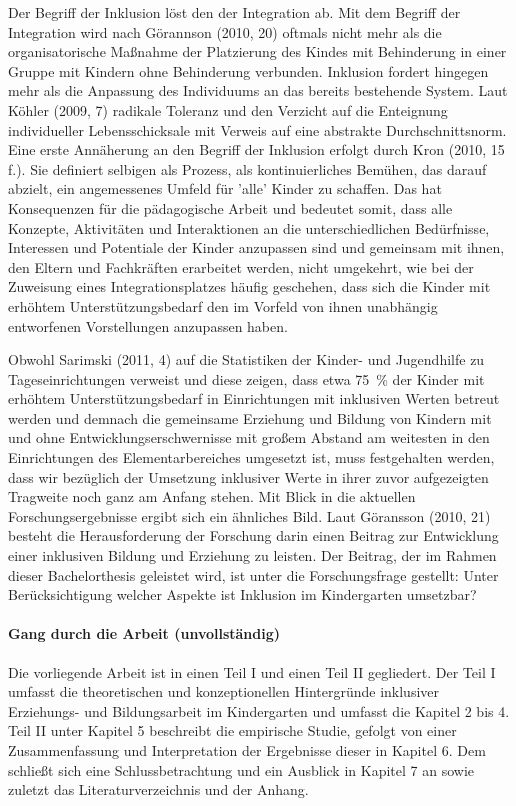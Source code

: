 Der Begriff der Inklusion löst den der Integration ab. Mit dem Begriff der Integration wird nach Görannson (2010, 20) oftmals nicht mehr als die organisatorische Maßnahme der Platzierung des Kindes mit Behinderung in einer Gruppe mit Kindern ohne Behinderung verbunden. Inklusion fordert hingegen mehr als die Anpassung des Individuums an das bereits bestehende System. Laut Köhler (2009, 7) radikale Toleranz und den Verzicht auf die Enteignung individueller Lebensschicksale mit Verweis auf eine abstrakte Durchschnittsnorm. Eine erste Annäherung an den Begriff der Inklusion erfolgt durch Kron (2010, 15 f.). Sie definiert selbigen als Prozess, als kontinuierliches Bemühen, das darauf abzielt, ein angemessenes Umfeld für ’alle’ Kinder zu schaffen. Das hat Konsequenzen für die pädagogische Arbeit und bedeutet somit, dass alle Konzepte, Aktivitäten und Interaktionen an die unterschiedlichen Bedürfnisse, Interessen und Potentiale der Kinder anzupassen sind und gemeinsam mit ihnen, den Eltern und Fachkräften erarbeitet werden, nicht umgekehrt, wie bei der Zuweisung eines Integrationsplatzes häufig geschehen, dass sich die Kinder mit erhöhtem Unterstützungsbedarf den im Vorfeld von ihnen unabhängig entworfenen Vorstellungen anzupassen haben.  

Obwohl Sarimski (2011, 4) auf die Statistiken der Kinder- und Jugendhilfe zu Tageseinrichtungen verweist und diese zeigen, dass etwa 75~\% der Kinder mit erhöhtem Unterstützungsbedarf in Einrichtungen mit inklusiven Werten betreut werden und demnach die gemeinsame Erziehung und Bildung von Kindern mit und ohne Entwicklungserschwernisse mit großem Abstand am weitesten in den Einrichtungen des Elementarbereiches umgesetzt ist, muss festgehalten werden, dass wir bezüglich der Umsetzung inklusiver Werte in ihrer zuvor aufgezeigten Tragweite noch ganz am Anfang stehen. Mit Blick in die aktuellen Forschungsergebnisse ergibt sich ein ähnliches Bild. Laut Göransson (2010, 21) besteht die Herausforderung der Forschung darin einen Beitrag zur Entwicklung einer inklusiven Bildung und Erziehung zu leisten. Der Beitrag, der im Rahmen dieser Bachelorthesis geleistet wird, ist unter die Forschungsfrage gestellt: Unter Berücksichtigung welcher Aspekte ist Inklusion im Kindergarten umsetzbar?

\paragraph{Gang durch die Arbeit (unvollständig)} 
Die vorliegende Arbeit ist in einen Teil I und einen Teil II gegliedert. Der Teil I umfasst die theoretischen und konzeptionellen Hintergründe inklusiver Erziehungs- und Bildungsarbeit im Kindergarten und umfasst die Kapitel 2 bis 4. Teil II unter Kapitel 5 beschreibt die empirische Studie, gefolgt von einer Zusammenfassung und Interpretation der Ergebnisse dieser in Kapitel 6. Dem schließt sich eine Schlussbetrachtung und ein Ausblick in Kapitel 7 an sowie zuletzt das Literaturverzeichnis und der Anhang.

